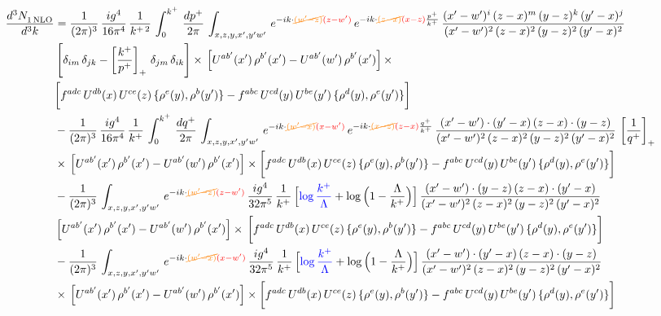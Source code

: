 \documentclass[9pt]{article}
\numberwithin{equation}{section}
\begin{document}
\begin{align}
     \frac{d^{3}N_{1\,\rm NLO}^{\rm}}{d^{3}k}  & = \frac{1}{(2\pi)^{3}}\, \frac{ig^{4}}{16\pi^{4}}\, \frac{1}{k^{+\,2}}\,\int_{0}^{k^{+}}\, \frac{dp^{+}}{2\pi}\,\int_{x,z,y,x',y'w'}\,e^{-ik\cdot {\color{orange}\cancel{(w^\prime-z)}}{\color{red}(z-w^\prime)}}\,e^{-ik\cdot {\color{orange}\cancel{(z-x)}}{\color{red}(x-z)}\frac{p^{+}}{k^{+}}}\,\frac{(x'-w')^{i}\,(z-x)^{m}\,(y-z)^{k}\,(y'-x)^{j}}{(x'-w')^{2}\,(z-x)^{2}\,(y-z)^{2}\,(y'-x)^{2}}\,\notag \\ & \left[\delta_{im}\,\delta_{jk}-\left[\frac{k^{+}}{p^{+}}\right]_{+}\, \delta_{jm}\,\delta_{ik}\right]\times\, \left[U^{ab'}(x')\,\rho^{b'}(x')-U^{ab'}(w')\,\rho^{b'}(x')\right]\times\notag \\ & \bigg[f^{adc}\,U^{db}(x)\,U^{ce}(z)\, \{\rho^{e}(y),\rho^{b}(y')\}-f^{abc}\,U^{cd}(y)\,U^{be}(y')\, \{\rho^{d}(y),\rho^{e}(y')\}\bigg]\notag \\ & -\frac{1}{(2\pi)^{3}}\, \frac{ig^{4}}{16\pi^{4}}\, \frac{1}{k^{+}}\,\int_{0}^{k^{+}}\, \frac{dq^{+}}{2\pi}\,\int_{x,z,y,x',y'w'}\,e^{-ik\cdot {\color{orange}\cancel{(w^\prime-x)}}{\color{red}(x-w^\prime)}}\,e^{-ik\cdot {\color{orange}\cancel{(x-z)}}{\color{red}(z-x)}\frac{q^{+}}{k^{+}}}\,\frac{(x'-w')\cdot (y'-x)\,(z-x)\cdot (y-z)}{(x'-w')^{2}\,(z-x)^{2}\,(y-z)^{2}\,(y'-x)^{2}}\,\left[\frac{1}{q^{+}}\right]_{+}\notag \\ & \times\, \left[U^{ab'}(x')\,\rho^{b'}(x')-U^{ab'}(w')\,\rho^{b'}(x')\right]\times \bigg[f^{adc}\,U^{db}(x)\,U^{ce}(z)\, \{\rho^{e}(y),\rho^{b}(y')\}-f^{abc}\,U^{cd}(y)\,U^{be}(y')\, \{\rho^{d}(y),\rho^{e}(y')\}\bigg]\notag \\ & -\frac{1}{(2\pi)^{3}}\, \int_{x,z,y,x',y'w'}\,e^{-ik\cdot {\color{orange}\cancel{(w^\prime-z)}}{\color{red}(z-w^\prime)}}\,\frac{ig^{4}}{32\pi^{5}}\, \frac{1}{k^{+}}\,\Big[{\color{blue}\log\frac{k^{+}}{\Lambda}}+\log\Big(1-\frac{\Lambda}{k^{+}}\Big)\Big]\,\frac{(x'-w')\cdot (y-z)\,(z-x)\cdot (y'-x)}{(x'-w')^{2}\,(z-x)^{2}\,(y-z)^{2}\,(y'-x)^{2}}\,\notag \\ & \left[U^{ab'}(x')\,\rho^{b'}(x')-U^{ab'}(w')\,\rho^{b'}(x')\right]\times\, \bigg[f^{adc}\,U^{db}(x)\,U^{ce}(z)\, \{\rho^{e}(y),\rho^{b}(y')\}-f^{abc}\,U^{cd}(y)\,U^{be}(y')\, \{\rho^{d}(y),\rho^{e}(y')\}\bigg]\notag \\ &  -\frac{1}{(2\pi)^{3}}\, \int_{x,z,y,x',y'w'}\,e^{-ik\cdot {\color{orange}\cancel{(w^\prime-x)}}{\color{red}(x-w^\prime)}}\,\frac{ig^{4}}{32\pi^{5}}\, \frac{1}{k^{+}}\,\Big[{\color{blue}\log\frac{k^{+}}{\Lambda}}+\log\Big(1-\frac{\Lambda}{k^{+}}\Big)\Big]\,\frac{(x'-w')\cdot (y'-x)\,(z-x)\cdot (y-z)}{(x'-w')^{2}\,(z-x)^{2}\,(y-z)^{2}\,(y'-x)^{2}}\notag \\ & \times\, \left[U^{ab'}(x')\,\rho^{b'}(x')-U^{ab'}(w')\,\rho^{b'}(x')\right]\times \bigg[f^{adc}\,U^{db}(x)\,U^{ce}(z)\, \{\rho^{e}(y),\rho^{b}(y')\}-f^{abc}\,U^{cd}(y)\,U^{be}(y')\, \{\rho^{d}(y),\rho^{e}(y')\}\bigg]
\end{align}
\end{document}
